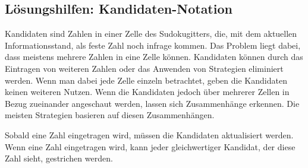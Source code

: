 \subsection{Lösungshilfen: Kandidaten-Notation}
Kandidaten sind Zahlen in einer Zelle des Sudokugitters, die, mit dem aktuellen Informationsstand, als feste Zahl noch infrage kommen. Das Problem liegt dabei, dass meistens mehrere Zahlen in eine Zelle können. Kandidaten können durch das Eintragen von weiteren Zahlen oder das Anwenden von Strategien eliminiert werden. Wenn man dabei jede Zelle einzeln betrachtet, geben die Kandidaten keinen weiteren Nutzen. Wenn die Kandidaten jedoch über mehrerer Zellen in Bezug zueinander angeschaut werden, lassen sich Zusammenhänge erkennen. Die meisten Strategien basieren auf diesen Zusammenhängen. 

Sobald eine Zahl eingetragen wird, müssen die Kandidaten aktualisiert werden. Wenn eine Zahl eingetragen wird, kann jeder gleichwertiger Kandidat, der diese Zahl sieht, gestrichen werden.
